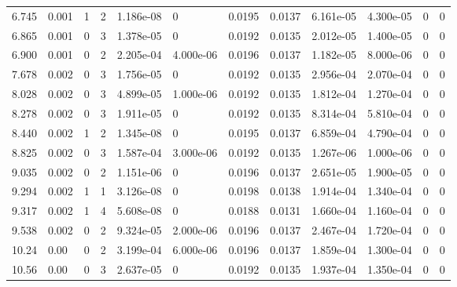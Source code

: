 \documentclass[preview]{standalone}
\begin{document}
{{\begin{tabular}{L{1.2cm}C{1.2cm} C{0.3cm}C{0.5cm} C{1.4cm}C{1.4cm} C{1.4cm}C{1.4cm} C{1.6cm}C{1.6cm} C{1.6cm}C{1.6cm}}
  6.745  &  0.001  & 1     &  2 &  1.186e-08  & 0  &  0.0195&   0.0137& 6.161e-05 & 4.300e-05   &  0 & 0  \\ 
  6.865  &  0.001  & 0     &  3 &  1.378e-05  & 0  &  0.0192&   0.0135& 2.012e-05 & 1.400e-05   &  0 & 0  \\ 
  6.900  &  0.001  & 0     &  2 &  2.205e-04  & 4.000e-06  &  0.0196&   0.0137& 1.182e-05 & 8.000e-06   &  0 & 0  \\ 
  7.678  &  0.002  & 0     &  3 &  1.756e-05  & 0  &  0.0192&   0.0135& 2.956e-04 & 2.070e-04   &  0 & 0  \\ 
  8.028  &  0.002  & 0     &  3 &  4.899e-05  & 1.000e-06  &  0.0192&   0.0135& 1.812e-04 & 1.270e-04   &  0 & 0  \\ 
  8.278  &  0.002  & 0     &  3 &  1.911e-05  & 0  &  0.0192&   0.0135& 8.314e-04 & 5.810e-04   &  0 & 0  \\ 
  8.440  &  0.002  & 1     &  2 &  1.345e-08  & 0  &  0.0195&   0.0137& 6.859e-04 & 4.790e-04   &  0 & 0  \\ 
  8.825  &  0.002  & 0     &  3 &  1.587e-04  & 3.000e-06  &  0.0192&   0.0135& 1.267e-06 & 1.000e-06   &  0 & 0  \\ 
  9.035  &  0.002  & 0     &  2 &  1.151e-06  & 0  &  0.0196&   0.0137& 2.651e-05 & 1.900e-05   &  0 & 0  \\ 
  9.294  &  0.002  & 1     &  1 &  3.126e-08  & 0  &  0.0198&   0.0138& 1.914e-04 & 1.340e-04   &  0 & 0  \\ 
  9.317  &  0.002  & 1     &  4 &  5.608e-08  & 0  &  0.0188&   0.0131& 1.660e-04 & 1.160e-04   &  0 & 0  \\ 
  9.538  &  0.002  & 0     &  2 &  9.324e-05  & 2.000e-06  &  0.0196&   0.0137& 2.467e-04 & 1.720e-04   &  0 & 0  \\ 
  10.24  &  0.00  & 0     &  2 &  3.199e-04  & 6.000e-06  &  0.0196&   0.0137& 1.859e-04 & 1.300e-04   &  0 & 0  \\ 
  10.56  &  0.00  & 0     &  3 &  2.637e-05  & 0  &  0.0192&   0.0135& 1.937e-04 & 1.350e-04   &  0 & 0  \\ 
\hline 
\end{tabular} 

}}
\end{document}
